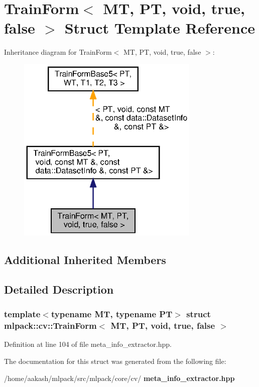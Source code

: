 \section{Train\+Form$<$ MT, PT, void, true, false $>$ Struct Template Reference}
\label{structmlpack_1_1cv_1_1TrainForm_3_01MT_00_01PT_00_01void_00_01true_00_01false_01_4}


Inheritance diagram for Train\+Form$<$ MT, PT, void, true, false $>$\+:
\nopagebreak
\begin{figure}[H]
\begin{center}
\leavevmode
\includegraphics[width=247pt]{structmlpack_1_1cv_1_1TrainForm_3_01MT_00_01PT_00_01void_00_01true_00_01false_01_4__inherit__graph}
\end{center}
\end{figure}
\subsection*{Additional Inherited Members}


\subsection{Detailed Description}
\subsubsection*{template$<$typename MT, typename PT$>$\newline
struct mlpack\+::cv\+::\+Train\+Form$<$ M\+T, P\+T, void, true, false $>$}



Definition at line 104 of file meta\+\_\+info\+\_\+extractor.\+hpp.



The documentation for this struct was generated from the following file\+:\begin{DoxyCompactItemize}
\item 
/home/aakash/mlpack/src/mlpack/core/cv/\textbf{ meta\+\_\+info\+\_\+extractor.\+hpp}\end{DoxyCompactItemize}
